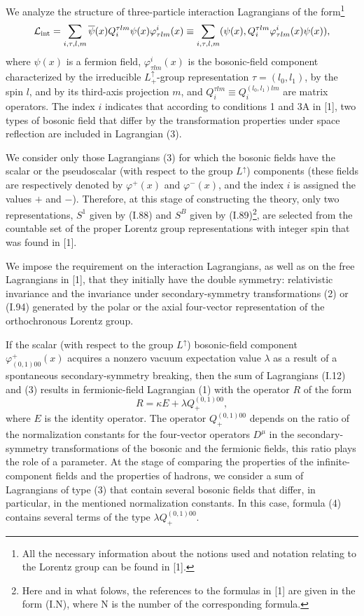 \documentclass[a4paper,12pt]{article}
\begin{document}
We analyze the structure of three-particle interaction Lagrangians of 
the form\footnote[1]{All the necessary information about the notions used and
notation relating to the Lorentz group can be found in [1].}  
\begin{equation}
{\cal L}_{\rm int} = \sum_{i,\tau,l,m} 
\overline{\psi} (x) Q^{\tau lm}_{i} \psi (x) \varphi_{\tau lm}^{i} (x)
\equiv \sum_{i,\tau ,l,m} 
(\psi (x), Q^{\tau lm}_{i} \varphi_{\tau lm}^{i} (x) \psi (x)),
\end{equation}
where $\psi (x)$ is a fermion field, $\varphi_{\tau lm}^{i} (x)$ is the
bosonic-field component characterized by the irreducible
$L^{\uparrow}_{+}$-group representation $\tau = (l_{0}, l_{1})$, by the spin 
$l$, and by its third-axis projection $m$, and  $Q^{\tau lm}_{i} \equiv 
Q^{(l_{0}, l_{1})lm}_{i}$ are matrix operators. The index $i$ indicates that
according to conditions 1 and 3A in [1], two types of bosonic field that differ
by the transformation properties under space reflection are included in
Lagrangian (3).

We consider only those Lagrangians (3) for which the bosonic fields have the
scalar or the pseudoscalar (with respect to the group $L^{\uparrow}$) 
components (these fields are respectively denoted by $\varphi^{+}(x)$ and
$\varphi^{-}(x)$, and the index $i$ is assigned the values $+$ and $-$).
Therefore, at this stage of constructing the theory, only two representations,
$S^{1}$ given by (I.88) and $S^{B}$ given by (I.89)\footnote[2]{Here and in
what folows, the references to the formulas in [1] are given in the form (I.N),
where N is the number of the corresponding formula.}, are selected from the
countable set of the proper Lorentz group representations with integer spin
that was found in [1]. 
 
We impose the requirement on the interaction Lagrangians, as well as on the
free Lagrangians in [1], that they initially have the double symmetry:
relativistic invariance and the invariance under secondary-symmetry
transformations (2) or (I.94) generated by the polar or the axial four-vector
representation of the orthochronous Lorentz group.

If the scalar (with respect to the group $L^{\uparrow}$) bosonic-field 
component $\varphi^{+}_{(0,1)00}(x)$ acquires a nonzero vacuum expectation
value $\lambda$ as a result of a spontaneous secondary-symmetry breaking, then
the sum of Lagrangians (I.12) and (3) results in fermionic-field Lagrangian (1)
with the operator $R$ of the form
\begin{equation}
R = \kappa E + \lambda Q^{(0,1)00}_{+},
\end{equation}
where $E$ is the identity operator. The operator $Q^{(0,1)00}_{+}$ depends on
the ratio of the normalization constants for the four-vector operators 
$D^{\mu}$ in the secondary-symmetry transformations of the bosonic and the
fermionic fields, this ratio plays the role of a parameter. At the stage of
comparing the properties of the infinite-component fields and the properties of
hadrons, we consider a sum of Lagrangians of type (3) that contain several 
bosonic fields that differ, in particular, in the mentioned normalization 
constants. In this case, formula (4) contains several terms of the type 
$\lambda Q^{(0,1)00}_{+}$. 
\end{document}
